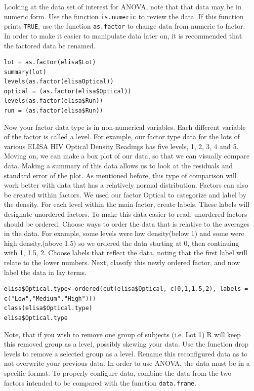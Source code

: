 Looking at the data set of interest for ANOVA, note that that data may be in numeric form.
Use the function \texttt{is.numeric} to review the data.
If this function prints \texttt{TRUE}, use the function \texttt{as.factor} to change data from numeric to factor.
In order to make it easier to manipulate data later on, it is recommended that the factored data be renamed. 
\begin{lstlisting}
lot = as.factor(elisa$Lot)
summary(lot)
levels(as.factor(elisaOptical))
optical = (as.factor(elisa$Optical))
levels(as.factor(elisa$Run))
run = (as.factor(elisa$Run))
\end{lstlisting}
Now your factor data type is in non-numerical variables.
Each different variable of the factor is called a level.
For example, our factor type data for the lots of various ELISA HIV Optical Density Readings has five levels, 1, 2, 3, 4 and 5.
Moving on, we can make a box plot of our data, so that we can visually compare data.
Making a summary of this data allows us to look at the residuals and standard error of the plot.
As mentioned before, this type of comparison will work better with data that has a relatively normal distribution. 
Factors can also be created within factors.
We used our factor Optical to categorize and label by the density.
For each level within the main factor, create labels.
These labels will designate unordered factors.
To make this data easier to read, unordered factors should be ordered.
Choose ways to order the data that is relative to the averages in the data.
For example, some levels were low density(below 1) and some were high density,(above 1.5) so we ordered the data starting at 0, then continuing with 1, 1.5, 2.
Choose labels that reflect the data, noting that the first label will relate to the lower numbers.
Next, classify this newly ordered factor, and now label the data in lay terms. 
\begin{lstlisting}
elisa$Optical.type<-ordered(cut(elisa$Optical, c(0,1,1.5,2), labels = c("Low","Medium","High")))
class(elisa$Optical.type)
elisa$Optical.type
\end{lstlisting}
Note, that if you wish to remove one group of subjects (i.e. Lot 1) R will keep this removed group as a level, possibly skewing your data.
Use the function drop levels to remove a selected group as a level.
Rename this reconfigured data as to not overwrite your previous data. 
In order to use ANOVA, the data must be in a specific format. To properly configure data, combine the data from the two factors intended to be compared with the function \texttt{data.frame}.
